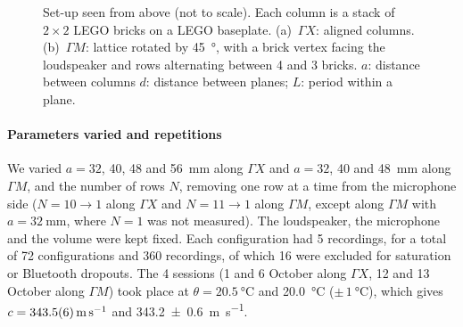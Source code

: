 \documentclass[9pt,a4paper,twocolumn]{extarticle}
\begin{document}
\begin{figure}[H]
{}
  \caption{Set-up seen from above (not to scale). Each column is a stack of $2\times2$ LEGO bricks on a LEGO baseplate. (a)~$\Gamma X$: aligned columns. (b)~$\Gamma M$: lattice rotated by \SI{45}{\degree}, with a brick vertex facing the loudspeaker and rows alternating between 4 and 3 bricks. $a$: distance between columns $d$: distance between planes; $L$: period within a plane.}
  \label{fig:setup}
\end{figure}

\paragraph{Parameters varied and repetitions}
We varied $a = 32$, 40, 48 and \SI{56}{\milli\metre} along $\Gamma X$ and $a = 32$, 40 and \SI{48}{\milli\metre} along $\Gamma M$, and the number of rows $N$, removing one row at a time from the microphone side ($N = 10 \to 1$ along $\Gamma X$ and $N = 11 \to 1$ along $\Gamma M$, except along $\Gamma M$ with $a = \SI{32}{\milli\metre}$, where $N = 1$ was not measured). The loudspeaker, the microphone and the volume were kept fixed. Each configuration had 5 recordings, for a total of 72 configurations and 360 recordings, of which 16 were excluded for saturation or Bluetooth dropouts. The 4 sessions (1 and 6 October along $\Gamma X$, 12 and 13 October along $\Gamma M$) took place at $\theta = \SI{20.5}{\celsius}$ and \SI{20.0}{\celsius} ($\pm\,\SI{1}{\celsius}$), which gives $c = \SI{343.5 \pm 0.6}{\metre\per\second}$ and \SI{343.2 \pm 0.6}{\metre\per\second}.
\end{document}
